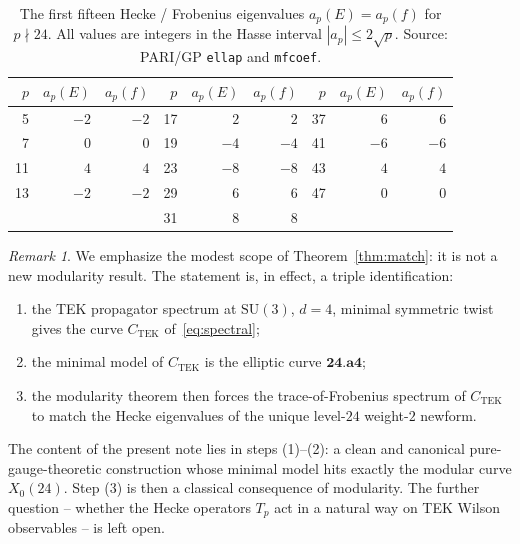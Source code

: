 \documentclass[11pt]{amsart}
\theoremstyle{definition}
\theoremstyle{remark}
\newtheorem{remark}[theorem]{Remark}
\newcommand{\SU}{\mathrm{SU}}
\newcommand{\TEK}{\mathrm{TEK}}
\begin{document}
\begin{table}[h]
\centering
\caption{The first fifteen Hecke / Frobenius eigenvalues
\(a_{p}(E) = a_{p}(f)\) for \(p \nmid 24\). All values are integers
in the Hasse interval \(|a_{p}| \le 2\sqrt{p}\). Source: PARI/GP
\texttt{ellap} and \texttt{mfcoef}.}
\label{tab:ap}
\begin{tabular}{rrr|rrr|rrr}
\toprule
\(p\) & \(a_{p}(E)\) & \(a_{p}(f)\) &
\(p\) & \(a_{p}(E)\) & \(a_{p}(f)\) &
\(p\) & \(a_{p}(E)\) & \(a_{p}(f)\) \\
\midrule
 5 & \(-2\) & \(-2\) &
17 & \(2\)  & \(2\)  &
37 & \(6\)  & \(6\)  \\
 7 & \(0\)  & \(0\)  &
19 & \(-4\) & \(-4\) &
41 & \(-6\) & \(-6\) \\
11 & \(4\)  & \(4\)  &
23 & \(-8\) & \(-8\) &
43 & \(4\)  & \(4\)  \\
13 & \(-2\) & \(-2\) &
29 & \(6\)  & \(6\)  &
47 & \(0\)  & \(0\)  \\
   &        &        &
31 & \(8\)  & \(8\)  &
   &        &        \\
\bottomrule
\end{tabular}
\end{table}

\begin{remark}\label{rem:scope}
We emphasize the modest scope of Theorem~\ref{thm:match}: it is
not a new modularity result. The statement is, in effect, a triple
identification:
\begin{enumerate}
\item the TEK propagator spectrum at \(\SU(3)\), \(d=4\),
minimal symmetric twist gives the curve \(C_{\TEK}\)
of~\eqref{eq:spectral};
\item the minimal model of \(C_{\TEK}\) is the elliptic curve
\(\mathbf{24.a4}\);
\item the modularity theorem then forces the trace-of-Frobenius
spectrum of \(C_{\TEK}\) to match the Hecke eigenvalues of the
unique level-\(24\) weight-\(2\) newform.
\end{enumerate}
The content of the present note lies in steps (1)--(2): a clean and
canonical pure-gauge-theoretic construction whose minimal model
hits exactly the modular curve \(X_{0}(24)\). Step (3) is then a
classical consequence of modularity. The further question --
whether the Hecke operators \(T_{p}\) act in a natural way on TEK
Wilson observables -- is left open.
\end{remark}
\end{document}
